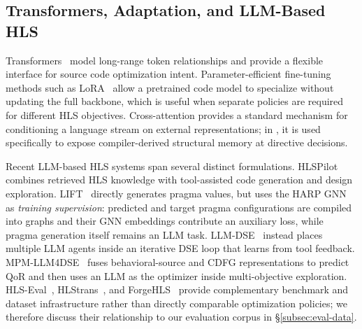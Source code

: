 \subsection{Transformers, Adaptation, and LLM-Based HLS}
\label{subsec:llm-background}

Transformers~\cite{vaswani2017attention} model long-range token relationships and provide a flexible interface for source code optimization intent. Parameter-efficient fine-tuning methods such as LoRA~\cite{hu2022lora} allow a pretrained code model to specialize without updating the full backbone, which is useful when separate policies are required for different HLS objectives. Cross-attention provides a standard mechanism for conditioning a language stream on external representations; in \framework, it is used specifically to expose compiler-derived structural memory at directive decisions.

Recent LLM-based HLS systems span several distinct formulations.
HLSPilot~\cite{xiong2024hlspilot} combines retrieved HLS knowledge with
tool-assisted code generation and design exploration. LIFT~\cite{prakriya2025lift} directly generates pragma values, but uses the HARP GNN as \emph{training supervision}: predicted and target pragma configurations are compiled into graphs and their GNN embeddings contribute an auxiliary loss, while pragma generation itself remains an LLM task. LLM-DSE~\cite{wang2025llmdse} instead places multiple LLM agents inside an iterative DSE loop that learns from tool feedback. MPM-LLM4DSE~\cite{xu2026mpmllm4dse} fuses behavioral-source and CDFG representations to predict QoR and then uses an LLM as the optimizer inside multi-objective exploration.
HLS-Eval~\cite{abikaram2025hlseval}, HLStrans~\cite{zou2025hlstrans}, and ForgeHLS~\cite{peng2025forgehls} provide complementary benchmark and dataset infrastructure rather than directly comparable optimization policies; we therefore discuss their relationship to our evaluation corpus in \S\ref{subsec:eval-data}.

